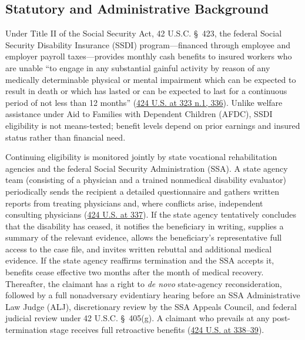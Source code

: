 \documentclass[12pt]{article}
\begin{document}
\subsection{Statutory and Administrative Background}
Under Title II of the Social Security Act, 42 U.S.C. \S~423, the federal Social Security Disability Insurance (SSDI) program---financed through employee and employer payroll taxes---provides monthly cash benefits to insured workers who are unable ``to engage in any substantial gainful activity by reason of any medically determinable physical or mental impairment which can be expected to result in death or which has lasted or can be expected to last for a continuous period of not less than 12 months'' (\href{https://supreme.justia.com/cases/federal/us/424/319/}{424 U.S. at 323 n.1, 336}). Unlike welfare assistance under Aid to Families with Dependent Children (AFDC), SSDI eligibility is not means-tested; benefit levels depend on prior earnings and insured status rather than financial need.

Continuing eligibility is monitored jointly by state vocational rehabilitation agencies and the federal Social Security Administration (SSA). A state agency team (consisting of a physician and a trained nonmedical disability evaluator) periodically sends the recipient a detailed questionnaire and gathers written reports from treating physicians and, where conflicts arise, independent consulting physicians (\href{https://supreme.justia.com/cases/federal/us/424/319/}{424 U.S. at 337}). If the state agency tentatively concludes that the disability has ceased, it notifies the beneficiary in writing, supplies a summary of the relevant evidence, allows the beneficiary's representative full access to the case file, and invites written rebuttal and additional medical evidence. If the state agency reaffirms termination and the SSA accepts it, benefits cease effective two months after the month of medical recovery. Thereafter, the claimant has a right to \emph{de novo} state-agency reconsideration, followed by a full nonadversary evidentiary hearing before an SSA Administrative Law Judge (ALJ), discretionary review by the SSA Appeals Council, and federal judicial review under 42 U.S.C. \S~405(g). A claimant who prevails at any post-termination stage receives full retroactive benefits (\href{https://supreme.justia.com/cases/federal/us/424/319/}{424 U.S. at 338--39}).
\end{document}
